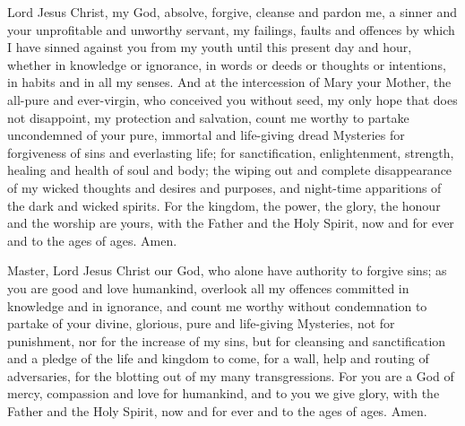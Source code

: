 
Lord Jesus Christ, my God, absolve, forgive, cleanse and pardon me, a sinner and your unprofitable and unworthy servant, my failings, faults and offences by which I have sinned against you from my youth until this present day and hour, whether in knowledge or ignorance, in words or deeds or thoughts or intentions, in habits and in all my senses. And at the intercession of Mary your Mother, the all-pure and ever-virgin, who conceived you without seed, my only hope that does not disappoint, my protection and salvation, count me worthy to partake uncondemned of your pure, immortal and life-giving dread Mysteries for forgiveness of sins and everlasting life; for sanctification, enlightenment, strength, healing and health of soul and body; the wiping out and complete disappearance of my wicked thoughts and desires and purposes, and night-time apparitions of the dark and wicked spirits. For the kingdom, the power, the glory, the honour and the worship are yours, with the Father and the Holy Spirit, now and for ever and to the ages of ages. Amen.


Master, Lord Jesus Christ our God, who alone have authority to forgive sins; as you are good and love humankind, overlook all my offences committed in knowledge and in ignorance, and count me worthy without condemnation to partake of your divine, glorious, pure and life-giving Mysteries, not for punishment, nor for the increase of my sins, but for cleansing and sanctification and a pledge of the life and kingdom to come, for a wall, help and routing of adversaries, for the blotting out of my many transgressions. For you are a God of mercy, compassion and love for humankind, and to you we give glory, with the Father and the Holy Spirit, now and for ever and to the ages of ages. Amen.


